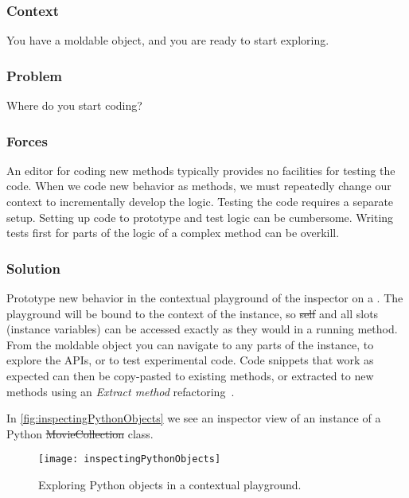 \documentclass[sigconf]{acmart}
\renewcommand{\nbc}[3]{} %
\newcommand\eog[1]{\nbc{Edward}{#1}{purple}}
\newcommand{\pattern}[1]{\emph{\nameref{pat:#1}}\xspace}
\begin{document}
\subsubsection*{Context}
You have a moldable object, and you are ready to start exploring.

\eog{So you're exploring maybe we could talk about what, what exploring means.
Like if you ask a regular developer, like tell me about the explorations you've done this morning, versus, hey, what kind of like debugging or like learning about the system?}

\subsubsection*{Problem}
Where do you start coding?

\subsubsection*{Forces}
An editor for coding new methods typically provides no facilities for testing the code.
When we code new behavior as methods, we must repeatedly change our context to incrementally develop the logic.
Testing the code requires a separate setup.
Setting up code to prototype and test logic can be cumbersome.
Writing tests first for parts of the logic of a complex method can be overkill.

\subsubsection*{Solution}
Prototype new behavior in the contextual playground of the inspector on a \pattern{moldableObject}.
The playground will be bound to the context of the instance, so \st{self} and all slots (\ie instance variables) can be accessed exactly as they would in a running method.
From the moldable object you can navigate to any parts of the instance, to explore the APIs, or to test experimental code.
Code snippets that work as expected can then be copy-pasted to existing methods, or extracted to new methods using an \emph{Extract method} refactoring~\cite{Fowl99a}.

In \autoref{fig:inspectingPythonObjects} we see an inspector view of an instance of a Python \st{MovieCollection} class.

\begin{figure}[h]
  \texttt{[image: inspectingPythonObjects]}
  \caption{Exploring Python objects in a contextual playground.}
  \label{fig:inspectingPythonObjects}
\end{figure}
\end{document}
